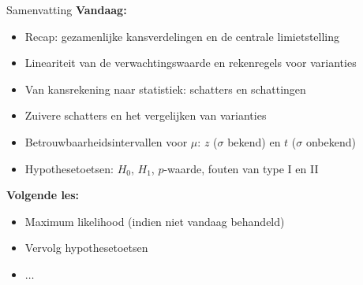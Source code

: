     \begin{frame}{Samenvatting}
        \textbf{Vandaag:}
        \begin{itemize}
            \item Recap: gezamenlijke kansverdelingen en de centrale limietstelling
            \item Lineariteit van de verwachtingswaarde en rekenregels voor varianties
            \item Van kansrekening naar statistiek: schatters en schattingen
            \item Zuivere schatters en het vergelijken van varianties
            \item Betrouwbaarheidsintervallen voor $\mu$: $z$ ($\sigma$ bekend) en $t$ ($\sigma$ onbekend)
            \item Hypothesetoetsen: $H_0$, $H_1$, $p$-waarde, fouten van type I en II
        \end{itemize}
        \vfill
        \textbf{Volgende les:}
        \begin{itemize}
            \item Maximum likelihood (indien niet vandaag behandeld)
            \item Vervolg hypothesetoetsen
            \item $\ldots$
        \end{itemize}
    \end{frame}

